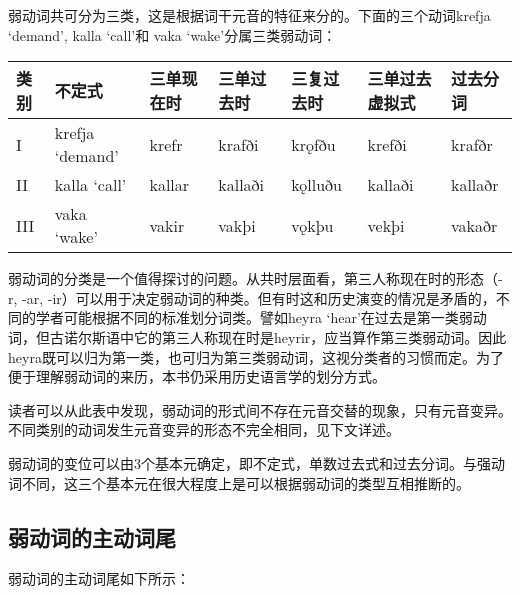 弱动词共可分为三类，这是根据词干元音的特征来分的。下面的三个动词krefja
`demand‌', kalla `call‌'和 vaka `wake‌'分属三类弱动词：

\begin{longtable}{lllllll}
    \toprule
    类别 & 不定式          & 三单现在时 & 三单过去时 & 三复过去时 & 三单过去虚拟式 & 过去分词 \\
    \midrule
    \endhead
    \bottomrule
    \endfoot
    I    & krefja `demand‌' & krefr      & krafði     & krǫfðu     & krefði         & krafðr   \\
    II   & kalla `call‌'    & kallar     & kallaði    & kǫlluðu    & kallaði        & kallaðr  \\
    III  & vaka `wake‌'     & vakir      & vakþi      & vǫkþu      & vekþi          & vakaðr   \\
\end{longtable}

弱动词的分类是一个值得探讨的问题。从共时层面看，第三人称现在时的形态（-r, -ar, -ir）可以用于决定弱动词的种类。但有时这和历史演变的情况是矛盾的，不同的学者可能根据不同的标准划分词类。譬如heyra `hear‌'在过去是第一类弱动词，但古诺尔斯语中它的第三人称现在时是heyrir，应当算作第三类弱动词。因此heyra既可以归为第一类，也可归为第三类弱动词，这视分类者的习惯而定。为了便于理解弱动词的来历，本书仍采用历史语言学的划分方式。

读者可以从此表中发现，弱动词的形式间不存在元音交替的现象，只有元音变异。不同类别的动词发生元音变异的形态不完全相同，见下文详述。

弱动词的变位可以由3个基本元确定，即不定式，单数过去式和过去分词。与强动词不同，这三个基本元在很大程度上是可以根据弱动词的类型互相推断的。

\subsection{弱动词的主动词尾}\label{弱动词的主动词尾}

弱动词的主动词尾如下所示：

